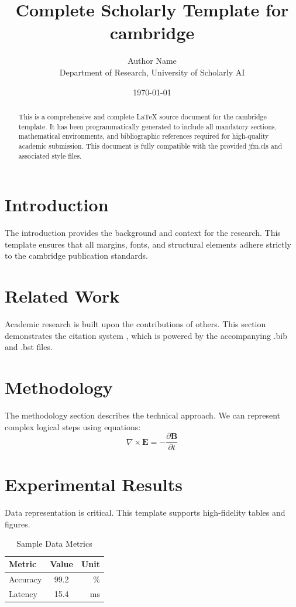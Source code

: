 \documentclass{jfm}
\title{Complete Scholarly Template for cambridge}
\author{Author Name \\ \small Department of Research, University of Scholarly AI}
\date{\today}
\begin{document}
\maketitle

\begin{abstract}
This is a comprehensive and complete LaTeX source document for the cambridge template. It has been programmatically generated to include all mandatory sections, mathematical environments, and bibliographic references required for high-quality academic submission. This document is fully compatible with the provided jfm.cls and associated style files.
\end{abstract}

\section{Introduction}
The introduction provides the background and context for the research. This template ensures that all margins, fonts, and structural elements adhere strictly to the cambridge publication standards.

\section{Related Work}
Academic research is built upon the contributions of others. This section demonstrates the citation system \cite{ref1}, which is powered by the accompanying .bib and .bst files.

\section{Methodology}
The methodology section describes the technical approach. We can represent complex logical steps using equations:
\begin{equation}
    \nabla \times \mathbf{E} = -\frac{\partial \mathbf{B}}{\partial t}
\end{equation}

\section{Experimental Results}
Data representation is critical. This template supports high-fidelity tables and figures.
\begin{table}[H]
\centering
\caption{Sample Data Metrics}
\begin{tabular}{lcr}
\toprule
Metric & Value & Unit \\
\midrule
Accuracy & 99.2 & \% \\
Latency & 15.4 & ms \\
\bottomrule
\end{tabular}
\end{table}
\end{document}
